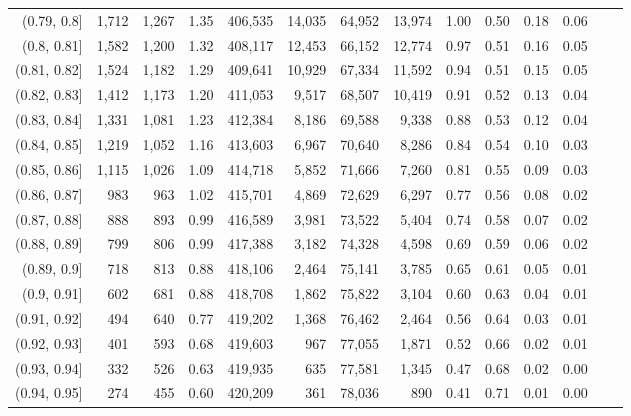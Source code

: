 \begin{tabular}{rrrrrrrrrrrrrr}
(0.79, 0.8]    &  1,712 &  1,267 &    1.35 &  406,535 &   14,035 &  64,952 &  13,974 &  1.00 &  0.50 &  0.18 &      0.06 \\
(0.8, 0.81]    &  1,582 &  1,200 &    1.32 &  408,117 &   12,453 &  66,152 &  12,774 &  0.97 &  0.51 &  0.16 &      0.05 \\
(0.81, 0.82]   &  1,524 &  1,182 &    1.29 &  409,641 &   10,929 &  67,334 &  11,592 &  0.94 &  0.51 &  0.15 &      0.05 \\
(0.82, 0.83]   &  1,412 &  1,173 &    1.20 &  411,053 &    9,517 &  68,507 &  10,419 &  0.91 &  0.52 &  0.13 &      0.04 \\
(0.83, 0.84]   &  1,331 &  1,081 &    1.23 &  412,384 &    8,186 &  69,588 &   9,338 &  0.88 &  0.53 &  0.12 &      0.04 \\
(0.84, 0.85]   &  1,219 &  1,052 &    1.16 &  413,603 &    6,967 &  70,640 &   8,286 &  0.84 &  0.54 &  0.10 &      0.03 \\
(0.85, 0.86]   &  1,115 &  1,026 &    1.09 &  414,718 &    5,852 &  71,666 &   7,260 &  0.81 &  0.55 &  0.09 &      0.03 \\
(0.86, 0.87]   &    983 &    963 &    1.02 &  415,701 &    4,869 &  72,629 &   6,297 &  0.77 &  0.56 &  0.08 &      0.02 \\
(0.87, 0.88]   &    888 &    893 &    0.99 &  416,589 &    3,981 &  73,522 &   5,404 &  0.74 &  0.58 &  0.07 &      0.02 \\
(0.88, 0.89]   &    799 &    806 &    0.99 &  417,388 &    3,182 &  74,328 &   4,598 &  0.69 &  0.59 &  0.06 &      0.02 \\
(0.89, 0.9]    &    718 &    813 &    0.88 &  418,106 &    2,464 &  75,141 &   3,785 &  0.65 &  0.61 &  0.05 &      0.01 \\
(0.9, 0.91]    &    602 &    681 &    0.88 &  418,708 &    1,862 &  75,822 &   3,104 &  0.60 &  0.63 &  0.04 &      0.01 \\
(0.91, 0.92]   &    494 &    640 &    0.77 &  419,202 &    1,368 &  76,462 &   2,464 &  0.56 &  0.64 &  0.03 &      0.01 \\
(0.92, 0.93]   &    401 &    593 &    0.68 &  419,603 &      967 &  77,055 &   1,871 &  0.52 &  0.66 &  0.02 &      0.01 \\
(0.93, 0.94]   &    332 &    526 &    0.63 &  419,935 &      635 &  77,581 &   1,345 &  0.47 &  0.68 &  0.02 &      0.00 \\
(0.94, 0.95]   &    274 &    455 &    0.60 &  420,209 &      361 &  78,036 &     890 &  0.41 &  0.71 &  0.01 &      0.00 \\

\end{tabular}
